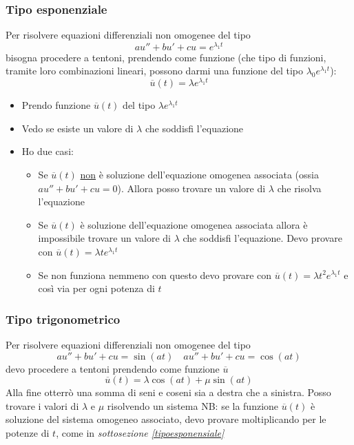\subsubsection*{Tipo esponenziale}
\label{tipoesponensiale}
Per risolvere equazioni differenziali non omogenee del tipo
\[
	au''+ bu' + cu = e^{\lambda_1 t}
\]
bisogna procedere a tentoni, prendendo come funzione (che tipo di funzioni, tramite loro combinazioni lineari, possono darmi una funzione del tipo $ \lambda_0 e^{\lambda_1 t} $):
\[
	\overline{u}\left( t \right) = \lambda  e^{\lambda_1 t}
\]
\begin{itemize}
	\item Prendo funzione $ \overline{u}\left( t \right)  $ del tipo $ \lambda e^{\lambda_1 t} $
	\item Vedo se esiste un valore di $  \lambda  $ che soddisfi l'equazione
	\item Ho due casi:
	      \begin{itemize}
		      \item Se $ \overline{u} \left( t \right)  $ \underline{non} è soluzione dell'equazione omogenea associata (ossia $ au''+ bu' + cu = 0$). Allora posso trovare un valore di $ \lambda $ che risolva l'equazione
		      \item Se $ \overline{u}\left( t \right)  $ è soluzione dell'equazione omogenea associata allora è impossibile trovare un valore di $ \lambda  $ che soddisfi l'equazione. Devo provare con $ \overline{u}\left( t \right) = \lambda t e^{\lambda_1 t} $
		      \item Se non funziona nemmeno con questo devo provare con $ \overline{u}\left( t \right) = \lambda t^2e^{\lambda_1 t} $ e così via per ogni potenza di $ t $
	      \end{itemize}
\end{itemize}
\subsubsection*{Tipo trigonometrico}
Per risolvere equazioni differenziali non omogenee del tipo
\[
	au''+ bu' + cu = \sin \left( at \right) \quad au''+ bu' + cu = \cos \left( at \right)
\]
devo procedere a tentoni prendendo come funzione $ \overline{u} $
\[
	\overline{u}\left( t \right) = \lambda \cos \left( at \right) + \mu \sin \left( at \right)
\]
Alla fine otterrò una somma di seni e coseni sia a destra che a sinistra. Posso trovare i valori di $ \lambda  $ e $ \mu  $ risolvendo un sistema
\vskip3mm
NB: se la funzione $ \overline{u}\left( t \right)  $ è soluzione del sistema omogeneo associato, devo provare moltiplicando per le potenze di $ t $, come in \textit{sottosezione \ref{tipoesponensiale}}
